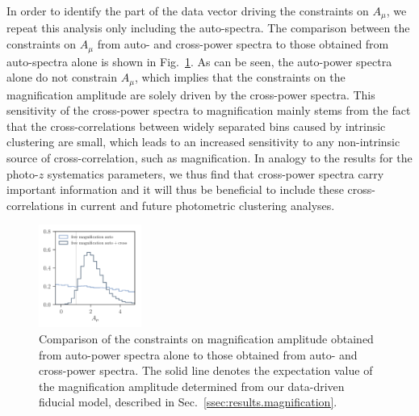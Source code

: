 \documentclass[a4paper,11pt]{article}
\begin{document}
    In order to identify the part of the data vector driving the constraints on $A_{\mu}$, we repeat this analysis only including the auto-spectra. The comparison between the constraints on $A_{\mu}$ from auto- and cross-power spectra to those obtained from auto-spectra alone is shown in Fig.~\ref{fig:constraints-fit=mag-bias-ampl_fit=auto+cross-vs-fit=mag-bias-ampl_fit=auto}. As can be seen, the auto-power spectra alone do not constrain $A_{\mu}$, which implies that the constraints on the magnification amplitude are solely driven by the cross-power spectra. This sensitivity of the cross-power spectra to magnification mainly stems from the fact that the cross-correlations between widely separated bins caused by intrinsic clustering are small, which leads to an increased sensitivity to any non-intrinsic source of cross-correlation, such as magnification. In analogy to the results for the photo-$z$ systematics parameters, we thus find that cross-power spectra carry important information and it will thus be beneficial to include these cross-correlations in current and future photometric clustering analyses. 

    \begin{figure}
      \begin{center}
        \includegraphics[width=0.3\textwidth]{figures/contours-A_mu_mPk=HOD_fix=alpha-fc-sigmaM_HOD=zevol_fit=pz-shifts+prior=0p2-pz-widths+prior=0p2_fit=auto+cross_cosmo=const-LINBIAS_HOD-param=zfid_clfit=HOD-zevol_mag-bias-free-fit=auto+cross-vs-mag-bias-free-fit=auto.pdf}
        \caption{Comparison of the constraints on magnification amplitude obtained from auto-power spectra alone to those obtained from auto- and cross-power spectra. The solid line denotes the expectation value of the magnification amplitude determined from our data-driven fiducial model, described in Sec.~\ref{ssec:results.magnification}.}
        \label{fig:constraints-fit=mag-bias-ampl_fit=auto+cross-vs-fit=mag-bias-ampl_fit=auto}
      \end{center}
    \end{figure}
\end{document}
